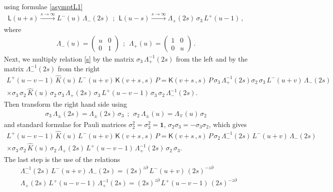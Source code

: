 \documentclass[11pt]{article}
\numberwithin{equation}{section}
\theoremstyle{plain}
\theoremstyle{definition}
\newcommand{\K}{\mathsf{K}}
\begin{document}
using formulae 
\eqref{asymptL1}
\begin{align*}
	\mathsf{L}(u+s) \xrightarrow{s\to\infty}
	L^{-}(u)\,\Lambda_{-}(2s)\ \ ;\ \ \mathsf{L}(u-s)
	\xrightarrow{s\to\infty} 
	\Lambda_{+}(2s)\,\sigma_3\, L^{+}(u-1)\,,
\end{align*}
where 
\begin{align*}
	\Lambda_{-}(u) = \left(\begin{array}{cc}
		u & 0 \\
		0 & 1\end{array}\right)  \ \ ; \ \ 
	\Lambda_{+}(u) = \left(\begin{array}{cc}
		1 & 0 \\
		0 & u\end{array}\right)\,.
\end{align*}
Next, we multiply relation \eqref{s} by the matrix $\sigma_3\,\Lambda^{-1}_{+}(2s)$ from the left and by the matrix $\Lambda^{-1}_{-}(2s)$ from the right
\begin{multline*} 
	L^{+}(u-v-1)\,\hat{K}(u)\,L^{-}(u+v)\,\K(v+s\,,s)\,P = 
	\K(v+s\,,s)\,P\,\sigma_3\,\Lambda^{-1}_{+}(2s)\sigma_2\,\sigma_3\,
	L^{-}(u+v)\,\Lambda_{-}(2s)\,\\ 
	\times\sigma_3\,\sigma_2\,
	\hat{K}(u)\,\sigma_2\,\sigma_3\,\Lambda_{+}(2s)\,\sigma_3\,
	L^{+}(u-v-1)\,\sigma_3\,\sigma_2\,\Lambda^{-1}_{-}(2s) .
\end{multline*}
Then transform the right hand side using
\begin{align}
	\sigma_3\,\Lambda_{\pm}(2s) = \Lambda_{\pm}(2s)\,\sigma_3 \ \ ;\ \ 
	\sigma_2\,\Lambda_{\pm}(u) = \Lambda_{\mp}(u)\,\sigma_2
\end{align}
and standard formulae for Pauli matrices 
$\sigma_2^2=\sigma_3^2 = \bm{1}$, $\sigma_2\sigma_3 = -\sigma_3\sigma_2$, which gives
\begin{multline*} 
	L^{+}(u-v-1)\,\hat{K}(u)\,L^{-}(u+v)\,\K(v+s\,,s)\,P = 
	\K(v+s\,,s)\,P\,\sigma_2\,\Lambda^{-1}_{-}(2s)\,
	L^{-}(u+v)\,\Lambda_{-}(2s)\,\\ 
	\times\sigma_3\,\sigma_2\,
	\hat{K}(u)\,\sigma_2\,\Lambda_{+}(2s)\,
	L^{+}(u-v-1)\,\Lambda^{-1}_{+}(2s)\,\sigma_2\,\sigma_3 .
\end{multline*}
The last step is the use of the relations 
\begin{align*}
	& \Lambda^{-1}_{-}(2s)\,
	L^{-}(u+v)\,\Lambda_{-}(2s) = (2s)^{z\partial}\,L^{-}(u+v)\,(2s)^{-z\partial} \\[4pt] 
	& \Lambda_{+}(2s)\,
	L^{+}(u-v-1)\,\Lambda^{-1}_{+}(2s) = (2s)^{z\partial}\,L^{+}(u-v-1)\,(2s)^{-z\partial}
\end{align*}
\end{document}
